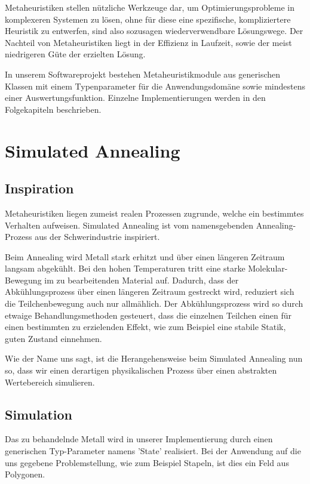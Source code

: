 \documentclass[runningheads,a4paper]{llncs}
\begin{document}
Metaheuristiken stellen nützliche Werkzeuge dar, um Optimierungsprobleme in komplexeren Systemen zu lösen, ohne für diese eine spezifische, kompliziertere Heuristik zu entwerfen, sind also sozusagen wiederverwendbare Lösungswege. Der Nachteil von Metaheuristiken liegt in der Effizienz in Laufzeit, sowie der meist niedrigeren Güte der erzielten Lösung.

In unserem Softwareprojekt bestehen Metaheuristikmodule aus generischen Klassen mit einem Typenparameter für die Anwendungsdomäne sowie mindestens einer Auswertungsfunktion. Einzelne Implementierungen werden in den Folgekapiteln beschrieben.


\section{Simulated Annealing}

\subsection{Inspiration}

\cite{1983Sci...220..671K} Metaheuristiken liegen zumeist realen Prozessen zugrunde, welche ein bestimmtes Verhalten aufweisen. Simulated Annealing ist vom namensgebenden Annealing-Prozess aus der Schwerindustrie inspiriert.

Beim Annealing wird  Metall stark erhitzt und über einen längeren Zeitraum langsam abgekühlt. Bei den hohen Temperaturen tritt eine starke Molekular-Bewegung im zu bearbeitenden Material auf. Dadurch, dass der Abkühlungsprozess über einen längeren Zeitraum gestreckt wird, reduziert sich die Teilchenbewegung auch nur allmählich. Der Abkühlungsprozess wird so durch etwaige Behandlungsmethoden gesteuert, dass die einzelnen Teilchen einen für einen bestimmten zu erzielenden Effekt, wie zum Beispiel eine stabile Statik, guten Zustand einnehmen.

Wie der Name uns sagt, ist die Herangehensweise beim Simulated Annealing nun so, dass wir einen derartigen physikalischen Prozess über einen abstrakten Wertebereich simulieren.

\subsection{Simulation}

Das zu behandelnde Metall wird in unserer Implementierung durch einen generischen Typ-Parameter namens 'State' realisiert. Bei der Anwendung auf die uns gegebene Problemstellung, wie zum Beispiel Stapeln, ist dies ein Feld aus Polygonen.
\end{document}
